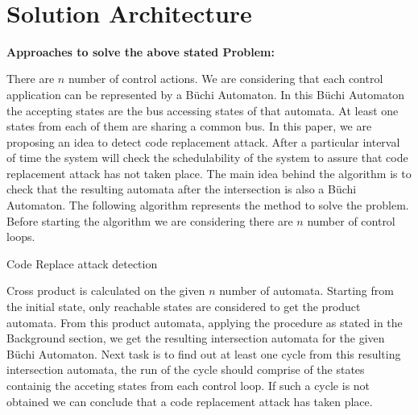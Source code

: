 \noindent
\\\section{Solution Architecture} \label{sec4}
\noindent
 

\textbf{ Approaches to solve the above stated Problem:}

  There are $n$ number of control actions. We are considering that each control application
  can be represented by a B\"{u}chi Automaton. In this B\"{u}chi Automaton the accepting states
  are the bus accessing states of that automata. At least one states from each of them 
  are sharing a common bus. In this paper, we are proposing an idea to   detect 
  code replacement attack. 
  After a particular interval of time the system will check the schedulability 
  of the system to assure that code replacement attack has not taken place. The main
  idea behind the algorithm is to check that the resulting automata after the intersection
  is also a B\"{u}chi Automaton.
  The following algorithm represents the method to solve the problem. Before starting
  the algorithm we are considering there are $n$ number of control loops.
  
\begin{algorithm}
  \caption{ Code Replace attack detection}
  \label{Code Replace attack detection}
  \begin{algorithmic}[1]
  
  \STATE Cross product is calculated on the given $n$ number of automata.
  \STATE Starting from the initial state, only reachable states are considered to get the product automata.
  \STATE From this product automata, applying the procedure as stated in the Background section, we get the
         resulting intersection automata for the given B\"{u}chi Automaton.
  \STATE Next task is to find out at least one cycle from this resulting intersection automata, the run of the
  cycle should comprise of the states containig the acceting states from each control loop.
  \STATE If such a cycle is not obtained we can conclude that a code replacement attack has taken place.
  \end{algorithmic}

\end{algorithm}


   
\begin{figure}
\begin{center}
\end{center}
\label{fig:Algorithm}
\end{figure}

